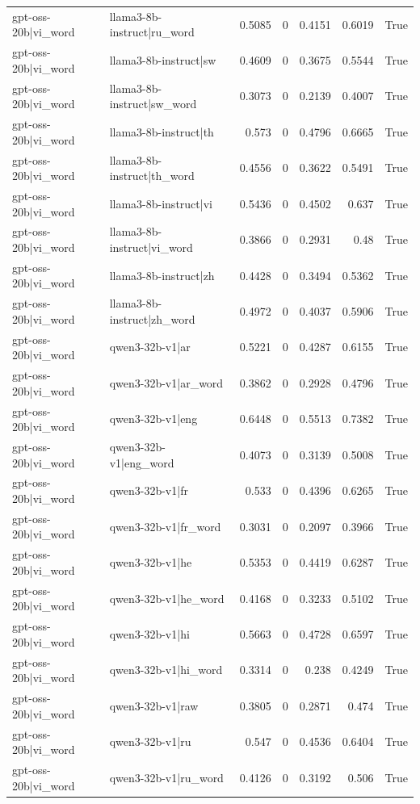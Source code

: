 \begin{table}
\begin{tabular}{l l r r r r l}
gpt-oss-20b|vi_word & llama3-8b-instruct|ru_word & 0.5085 & 0 & 0.4151 & 0.6019 & True \\
gpt-oss-20b|vi_word & llama3-8b-instruct|sw & 0.4609 & 0 & 0.3675 & 0.5544 & True \\
gpt-oss-20b|vi_word & llama3-8b-instruct|sw_word & 0.3073 & 0 & 0.2139 & 0.4007 & True \\
gpt-oss-20b|vi_word & llama3-8b-instruct|th & 0.573 & 0 & 0.4796 & 0.6665 & True \\
gpt-oss-20b|vi_word & llama3-8b-instruct|th_word & 0.4556 & 0 & 0.3622 & 0.5491 & True \\
gpt-oss-20b|vi_word & llama3-8b-instruct|vi & 0.5436 & 0 & 0.4502 & 0.637 & True \\
gpt-oss-20b|vi_word & llama3-8b-instruct|vi_word & 0.3866 & 0 & 0.2931 & 0.48 & True \\
gpt-oss-20b|vi_word & llama3-8b-instruct|zh & 0.4428 & 0 & 0.3494 & 0.5362 & True \\
gpt-oss-20b|vi_word & llama3-8b-instruct|zh_word & 0.4972 & 0 & 0.4037 & 0.5906 & True \\
gpt-oss-20b|vi_word & qwen3-32b-v1|ar & 0.5221 & 0 & 0.4287 & 0.6155 & True \\
gpt-oss-20b|vi_word & qwen3-32b-v1|ar_word & 0.3862 & 0 & 0.2928 & 0.4796 & True \\
gpt-oss-20b|vi_word & qwen3-32b-v1|eng & 0.6448 & 0 & 0.5513 & 0.7382 & True \\
gpt-oss-20b|vi_word & qwen3-32b-v1|eng_word & 0.4073 & 0 & 0.3139 & 0.5008 & True \\
gpt-oss-20b|vi_word & qwen3-32b-v1|fr & 0.533 & 0 & 0.4396 & 0.6265 & True \\
gpt-oss-20b|vi_word & qwen3-32b-v1|fr_word & 0.3031 & 0 & 0.2097 & 0.3966 & True \\
gpt-oss-20b|vi_word & qwen3-32b-v1|he & 0.5353 & 0 & 0.4419 & 0.6287 & True \\
gpt-oss-20b|vi_word & qwen3-32b-v1|he_word & 0.4168 & 0 & 0.3233 & 0.5102 & True \\
gpt-oss-20b|vi_word & qwen3-32b-v1|hi & 0.5663 & 0 & 0.4728 & 0.6597 & True \\
gpt-oss-20b|vi_word & qwen3-32b-v1|hi_word & 0.3314 & 0 & 0.238 & 0.4249 & True \\
gpt-oss-20b|vi_word & qwen3-32b-v1|raw & 0.3805 & 0 & 0.2871 & 0.474 & True \\
gpt-oss-20b|vi_word & qwen3-32b-v1|ru & 0.547 & 0 & 0.4536 & 0.6404 & True \\
gpt-oss-20b|vi_word & qwen3-32b-v1|ru_word & 0.4126 & 0 & 0.3192 & 0.506 & True \\

\end{tabular}
\end{table}
